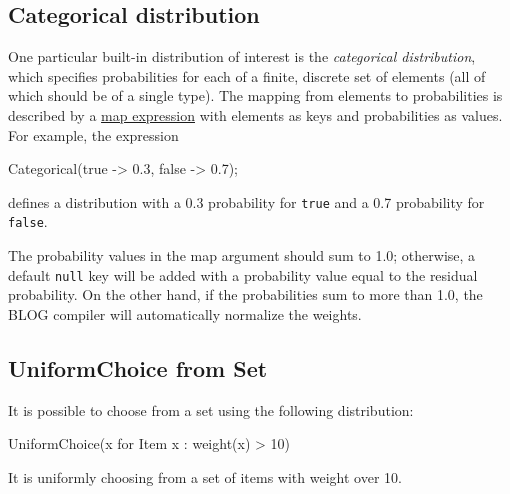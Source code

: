 \documentclass[12pt]{article}
\begin{document}
\subsection{Categorical distribution}\label{categorical-section}

One particular built-in distribution of interest is the
{\em categorical distribution}, which specifies probabilities for each
of a finite, discrete set of elements (all of which should be of a
single type). The mapping from elements to probabilities is described
by a \hyperref[map-section]{map expression} with elements as keys and
probabilities as values. For example, the expression
\begin{blogcode}
Categorical({true -> 0.3, false -> 0.7});
\end{blogcode}
defines a distribution with a 0.3 probability for {\tt true} and a 0.7
probability for {\tt false}.

The probability values in the map argument should sum to 1.0;
otherwise, a default \texttt{null} key will be added with a
probability value equal to the residual probability.  On the other hand, if the probabilities sum to more than 1.0, the BLOG
compiler will automatically normalize the weights.


\subsection{UniformChoice from Set} \label{uniformchoice-section}
It is possible to choose from a set using the following distribution:
\begin{blogcode}
UniformChoice({x for Item x : weight(x) > 10})
\end{blogcode}
It is uniformly choosing from a set of items with weight over 10. 

\end{document}
